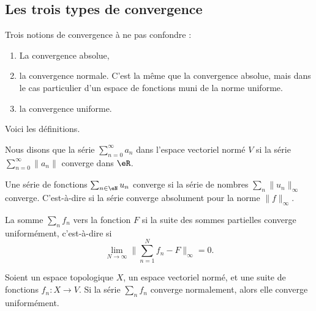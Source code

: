 \subsection{Les trois types de convergence}

Trois notions de convergence à ne pas confondre :
\begin{enumerate}
	\item
	      La convergence absolue,
	\item
	      la convergence normale. C'est la même que la convergence absolue, mais dans le cas particulier d'un espace de fonctions muni de la norme uniforme.
	\item
	      la convergence uniforme.
\end{enumerate}
Voici les définitions.

\begin{definition} \label{DefVFUIXwU}
	Nous disons que la série \( \sum_{n=0}^{\infty}a_n\) dans l'espace vectoriel normé \( V\)  si la série \( \sum_{n=0}^{\infty}\| a_n \|\) converge dans \( \eR\).
\end{definition}

\begin{definition} \label{DefVBrJUxo}
	Une série de fonctions \( \sum_{n\in \eN}u_n \) converge  si la série de nombres \( \sum_n\| u_n \|_{\infty}\) converge. C'est-à-dire si la série converge absolument pour la norme \( \| f \|_{\infty}\).
\end{definition}

\begin{definition}        \label{DEFooPABSooPMXMOV}
	La somme \( \sum_nf_n\)  vers la fonction \( F\) si la suite des sommes partielles converge uniformément, c'est-à-dire si
	\begin{equation}        \label{EqLNCJooVCTiIw}
		\lim_{N\to \infty} \| \sum_{n=1}^Nf_n-F \|_{\infty}=0.
	\end{equation}
\end{definition}

\begin{lemma}       \label{LEMooJZTBooIopLok}
	Soient un espace topologique \( X\), un espace vectoriel normé, et une suite de fonctions \( f_n\colon X\to V\). Si la série \( \sum_nf_n\) converge normalement, alors elle converge uniformément.
\end{lemma}

